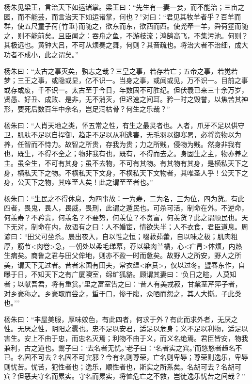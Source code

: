 \documentclass[]{article}
\begin{document}
杨朱见梁王，言治天下如运诸掌。梁王曰：``先生有一妻一妾，而不能治；三亩之园，而不能芸，而言治天下如运诸掌，何也？''对曰：``君见其牧羊者乎？百羊而群，使五尺童子荷\{竹垂\}而随之，欲东而东，欲西而西。使尧牵一羊，舜荷箠而随之，则不能前矣。且臣闻之：吞舟之鱼，不游枝流；鸿鹄高飞，不集污池。何则？其极远也。黄钟大吕，不可从烦奏之舞，何则？其音疏也。将治大者不治细，成大功者不成小，此之谓矣。''

杨朱曰：``太古之事灭矣，孰志之哉？三皇之事，若存若亡；五帝之事，若觉若梦；三王之事，或隐或显，亿不识一。当身之事，或闻或见，万不识一。目前之事或存或废，千不识一。太古至于今日，年数固不可胜纪。但伏羲已来三十余万岁，贤愚、好丑、成败、是非，无不消灭，但迟速之间耳。矜一时之毁誉，以焦苦其神形，要死后数百年中余名，岂足润枯骨？何生之乐哉？''

杨朱曰：``人肖天地之类，怀五常之性，有生之最灵者也。人者，爪牙不足以供守卫，肌肤不足以自捍御，趋走不足以从利逃害，无毛羽以御寒暑，必将资物以为养，任智而不恃力。故智之所贵，存我为贵；力之所贱，侵物为贱。然身非我有也，既生，不得不全之；物非我有也，既有，不得而去之。身固生之主，物亦养之主。虽全生，不可有其身；虽不去物，不可有其物。有其物有其身，是横私天下之身，横私天下之物。不横私天下文身，不横私天下文物者，其唯圣人乎！公天下之身，公天下之物，其唯至人矣！此之谓至至者也。''

杨朱曰：``生民之不得休息，为四事故：一为寿，二为名，三为位，四为货。有此四者，畏鬼，畏人，畏威，畏刑，此谓之遁民也。可杀可活，制命在外。不逆命，何羡寿？不矜贵，何羡名？不要势，何羡位？不贪富，何羡货？此之谓顺民也。天下无对，制命在内，故语有之曰：人不婚宦，情欲失半；人不衣食，君臣道息。周谚曰：``田父可坐杀。晨出夜入，自以性之恒；啜菽茹藿，自以味之极；肌肉粗厚，筋节\textless{}肉卷\textgreater{}急，一朝处以柔毛绨幕，荐以粱肉兰橘，心\textless{}疒肙\textgreater{}体烦，内热生病矣。商鲁之君与田父侔地，则亦不盈一时而惫矣。故野人之所安，野人之所美，谓天下无过者。昔者宋国有田夫，常衣缊\textless{}麻贲\textgreater{}，仅以过冬。暨春东作，自曝于日，不知天下之有广厦隩室，绵纩狐貉。顾谓其妻曰：`负日之暄，人莫知者；以献吾君，将有重赏。'里之富室告之曰：`昔人有美戎菽，甘枲茎芹萍子者，对乡豪称之。乡豪取而尝之，蜇于口，惨于腹，众哂而怨之，其人大惭。子此类也。'''

杨朱曰：``丰屋美服，厚味姣色，有此四者，何求于外？有此而求外者，无厌之性。无厌之性，阴阳之蠹也。忠不足以安君，适足以危身；义不足以利物，适足以害生。安上不由于忠，而忠名灭焉；利物不由于义，而义名绝焉。君臣皆安，物我兼利，古之道也。鬻子曰：`去名者无忧。'老子曰：`名者实之宾。'而悠悠者趋名不已。名固不可去？名固不可宾邪？今有名则尊荣，亡名则卑辱；尊荣则逸乐，卑辱则忧苦。忧苦，犯性者也；逸乐，顺性者也，斯实之所系矣。名胡可去？名胡可宾？但恶夫守名而累实。守名而累实，将恤危亡之不救，岂徒逸乐忧苦之间哉？''
\end{document}
